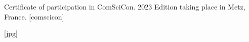 
\begin{wrtxFigEnv}[H][width=0.6\linewidth]
    {Certificate of participation in ComSciCon.}%
    {2023 Edition taking place in Metz, France.}%
    [comscicon]

    [jpg]

\end{wrtxFigEnv}